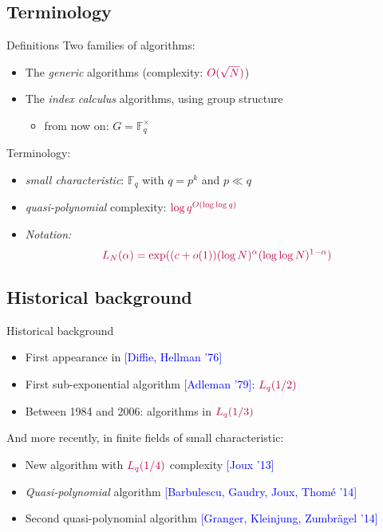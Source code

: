 \documentclass[xcolor=x11names,compress]{beamer}
\theoremstyle{break}
\theoremstyle{sc}
\theoremstyle{definition}
\theoremstyle{remark}
\begin{document}
\subsection{Terminology}
\begin{frame}{Definitions}
  Two families of algorithms:
  \begin{itemize}
    \item The \emph{generic} algorithms (complexity:
      $\textcolor{purple}{O(\sqrt N)}$)
    \item The \emph{index calculus} algorithms, using group structure
      \begin{itemize}
        \item from now on: $G=\mathbb{F}_q^\times$
      \end{itemize}
    \end{itemize}
    Terminology:
    \begin{itemize}
    \item \emph{small characteristic}: $\mathbb{F}_q$ with $q=p^k$ and $p\ll q$
    \item \emph{quasi-polynomial} complexity: $\textcolor{purple}{\log
        q^{O(\log \log q)}}$
      \item \emph{Notation:}
  \[
    \textcolor{purple}{L_N(\alpha) = \exp((c+o(1))(\log N)^\alpha(\log\log
      N)^{1-\alpha})}
  \]


  \end{itemize}
\end{frame}

\subsection{Historical background}
\begin{frame}{Historical background}
  \begin{itemize}
    \item First appearance in \textcolor{blue}{[Diffie, Hellman '76]}
    \item First sub-exponential algorithm \textcolor{blue}{[Adleman '79]}:
      $\textcolor{purple}{L_q(1/2)}$
    \item Between 1984 and 2006: algorithms in $\textcolor{purple}{L_q(1/3)}$
\end{itemize}
 And more recently, in finite fields of small characteristic:
  \begin{itemize}
    \item New algorithm with $\textcolor{purple}{L_q(1/4)}$ complexity
      \textcolor{blue}{[Joux '13]}
    \item \emph{Quasi-polynomial} algorithm \textcolor{blue}{[Barbulescu,
      Gaudry, Joux, Thomé '14]}
    \item Second quasi-polynomial algorithm \textcolor{blue}{[Granger,
      Kleinjung, Zumbrägel '14]}
  \end{itemize}
\end{frame}
\end{document}
